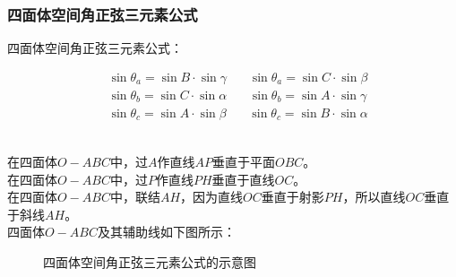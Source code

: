 \documentclass[UTF8]{ctexart}
\begin{document}
\newpage

\subsubsection{四面体空间角正弦三元素公式}
    四面体空间角正弦三元素公式：
    \begin{large}
        \begin{align*}
            &\sin{\theta_a}=\sin{B}\cdot\sin{\gamma}~~~~~~~~\sin{\theta_a}=\sin{C}\cdot\sin{\beta}\\[3mm]
            &\sin{\theta_b}=\sin{C}\cdot\sin{\alpha}~~~~~~~~\sin{\theta_b}=\sin{A}\cdot\sin{\gamma}\\[3mm]
            &\sin{\theta_c}=\sin{A}\cdot\sin{\beta}~~~~~~~~\sin{\theta_c}=\sin{B}\cdot\sin{\alpha}
        \end{align*}
    \end{large}\\
    在四面体$O-ABC$中，过$A$作直线$AP$垂直于平面$OBC$。\\[3mm]
    在四面体$O-ABC$中，过$P$作直线$PH$垂直于直线$OC$。\\[3mm]
    在四面体$O-ABC$中，联结$AH$，因为直线$OC$垂直于射影$PH$，所以直线$OC$垂直于斜线$AH$。\\[5mm]
    四面体$O-ABC$及其辅助线如下图所示：
    \begin{figure}[h!]
        \begin{center}
            \caption{四面体空间角正弦三元素公式的示意图}
        \end{center}
    \end{figure}\\
\end{document}
